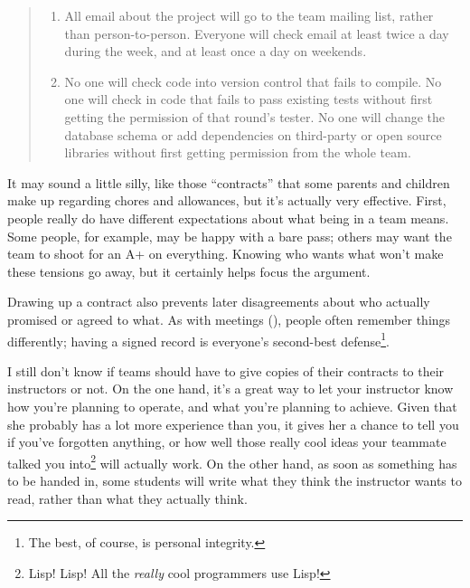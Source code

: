 \documentclass{report}
\begin{document}
\begin{quotation}
\begin{enumerate}
    \item All email about the project will go to the team mailing
    list, rather than person-to-person.  Everyone will check email at
    least twice a day during the week, and at least once a day on
    weekends.

    \item No one will check code into version control that fails to
    compile.  No one will check in code that fails to pass existing
    tests without first getting the permission of that round's tester.
    No one will change the database schema or add dependencies on
    third-party or open source libraries without first getting
    permission from the whole team.

  \end{enumerate}

\end{quotation}

It may sound a little silly, like those ``contracts'' that some
parents and children make up regarding chores and allowances, but
it's actually very effective.  First, people really do have
different expectations about what being in a team means.  Some
people, for example, may be happy with a bare pass; others may
want the team to shoot for an A+ on everything.  Knowing who wants
what won't make these tensions go away, but it certainly helps
focus the argument.

Drawing up a contract also prevents later disagreements about who
actually promised or agreed to what.  As with meetings
(), people often remember things
differently; having a signed record is everyone's second-best
defense\footnote{The best, of course, is personal integrity.}.

I still don't know if teams should have to give copies of their
contracts to their instructors or not.  On the one hand, it's a great
way to let your instructor know how you're planning to operate, and
what you're planning to achieve.  Given that she probably has a lot
more experience than you, it gives her a chance to tell you if you've
forgotten anything, or how well those really cool ideas your teammate
talked you into\footnote{Lisp!  Lisp!  All the \emph{really} cool
programmers use Lisp!} will actually work.  On the other hand, as soon
as something has to be handed in, some students will write what they
think the instructor wants to read, rather than what they actually
think.
\end{document}
